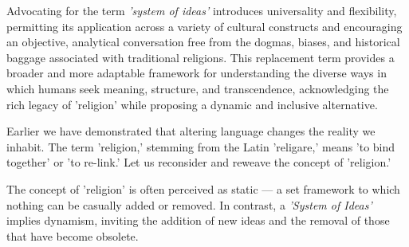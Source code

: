 \documentclass[12pt,a4]{article}
\begin{document}
\par
Advocating for the term \textit{'system of ideas'} introduces universality and flexibility, permitting its application across a variety of cultural constructs and encouraging an objective, analytical conversation free from the dogmas, biases, and historical baggage associated with traditional religions. This replacement term provides a broader and more adaptable framework for understanding the diverse ways in which humans seek meaning, structure, and transcendence, acknowledging the rich legacy of 'religion' while proposing a dynamic and inclusive alternative.

\par
Earlier we have demonstrated that altering language changes the reality we inhabit. The term 'religion,' stemming from the Latin 'religare,' means 'to bind together' or 'to re-link.' Let us reconsider and reweave the concept of 'religion.'

\par
The concept of 'religion' is often perceived as static — a set framework to which nothing can be casually added or removed. In contrast, a \textit{'System of Ideas'} implies dynamism, inviting the addition of new ideas and the removal of those that have become obsolete.





 

 




 


\end{document}
